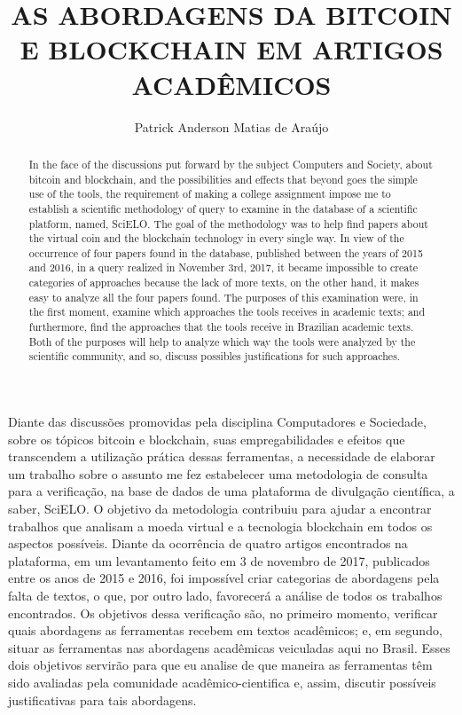 \documentclass[12pt]{article}
\title{AS ABORDAGENS DA BITCOIN E BLOCKCHAIN EM ARTIGOS ACADÊMICOS}
\author{Patrick Anderson Matias de Araújo\inst{1}}
\begin{document}
 

\maketitle
     
\begin{resumo} 
  Diante das discussões promovidas pela disciplina Computadores e Sociedade, sobre os tópicos bitcoin e blockchain, suas empregabilidades e efeitos que transcendem a utilização prática dessas ferramentas, a necessidade de elaborar um trabalho sobre o assunto me fez estabelecer uma metodologia de consulta para a verificação, na base de dados de uma plataforma de divulgação científica, a saber, SciELO. O objetivo da metodologia contribuiu para ajudar a encontrar trabalhos que analisam a moeda virtual e a tecnologia blockchain em todos os aspectos possíveis. Diante da ocorrência de quatro artigos encontrados na plataforma, em um levantamento feito em 3 de novembro de 2017, publicados entre os anos de 2015 e 2016, foi impossível criar categorias de abordagens pela falta de textos, o que, por outro lado, favorecerá a análise de todos os trabalhos encontrados. Os objetivos dessa verificação são, no primeiro momento, verificar quais abordagens as ferramentas recebem em textos acadêmicos; e, em segundo, situar as ferramentas nas abordagens acadêmicas veiculadas aqui no Brasil. Esses dois objetivos servirão para que eu analise de que maneira as ferramentas têm sido avaliadas pela comunidade acadêmico-cientifica e, assim, discutir possíveis justificativas para tais abordagens.
\end{resumo}

\begin{abstract}
In the face of the discussions put forward by the subject Computers and Society, about bitcoin and blockchain, and the possibilities and effects that beyond goes  the simple use of the tools, the requirement of making a college assignment impose me to establish a scientific methodology of query to examine in the database of a scientific platform, named, SciELO. The goal of the methodology was to help find papers about the virtual coin and the blockchain technology in every single way. In view of the occurrence of four papers found in the database, published between the years of 2015 and 2016, in a query realized in November 3rd, 2017, it became impossible to create categories of approaches because the lack of more texts, on the other hand, it makes easy to analyze all the four papers found. The purposes of this examination were, in the first moment, examine which approaches the tools receives in academic texts; and furthermore, find the approaches that the tools receive in Brazilian academic texts. Both of the purposes will help to analyze which way the tools were analyzed by the scientific community, and so, discuss possibles justifications for such approaches.
\end{abstract}
\end{document}
